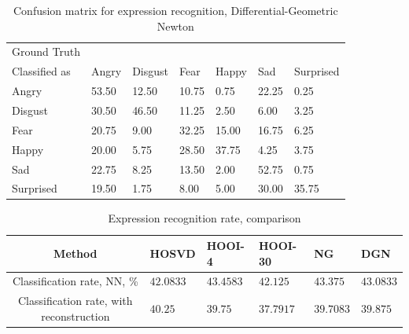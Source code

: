 \begin{table}[h]
\centering
\begin{tabular}{|l|l|l|l|l|l|l|}
\hline
Ground Truth\\Classified as    & Angry & Disgust & Fear & Happy & Sad & Surprised \\ \hline
Angry     &  	 53.50 	 &  12.50 	 &  10.75 	 &  0.75 	 &  22.25 	 &  0.25 \\
Disgust   &  	 30.50 	 &  46.50 	 &  11.25 	 &  2.50 	 &  6.00 	 &  3.25 \\
Fear      &  	 20.75 	 &  9.00 	 &  32.25 	 &  15.00 	 &  16.75 	 &  6.25 \\
Happy     &  	 20.00 	 &  5.75 	 &  28.50 	 &  37.75 	 &  4.25 	 &  3.75 \\
Sad       &  	 22.75 	 &  8.25 	 &  13.50 	 &  2.00 	 &  52.75 	 &  0.75 \\
Surprised &  	 19.50 	 &  1.75 	 &  8.00 	 &  5.00 	 &  30.00 	 &  35.75 \\ \hline
\end{tabular}
\caption{Confusion matrix for expression recognition, Differential-Geometric Newton}
\label{expr_rec_dg_newton_confmatr_nn}
\end{table}

\begin{table}[h]
\centering
\begin{tabular}{|c|l|l|l|l|l|}
\hline
                            Method              & HOSVD & HOOI-4 & HOOI-30 & NG & DGN \\ \hline
Classification rate, NN, \%                         & $42.0833$  & $43.4583$ & $42.125$ & $ 43.375 $ & $43.0833$ \\ \hline
Classification rate, with reconstruction            & $ 40.25 $  & $39.75 $  & $ 37.7917$ & $ 39.7083$ & $39.875 $ \\ \hline
\end{tabular}
\caption{Expression recognition rate, comparison}
\label{expr_rec_rate_total}
\end{table}
